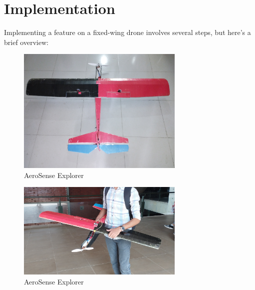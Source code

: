\documentclass[conference]{IEEEtran}
\begin{document}
\section{Implementation}

Implementing a feature on a fixed-wing drone involves several steps, but here's a brief overview\cite{ducard2009fault}\cite{mesquita2021steps}:
\begin{figure}[h]
    \begin{minipage}{0.47\textwidth}
        \flushright
        \includegraphics[width=8cm]{images/IMG_20240507_134642.jpg}
        \caption{AeroSense Explorer}
        \label{fig:enter-label}
    \end{minipage}
\end{figure}   

\begin{figure}[h]
    \begin{minipage}{0.47\textwidth}
        \flushright
        \includegraphics[width=8cm]{images/IMG_20240507_140708.jpg}
        \caption{AeroSense Explorer}
        \label{fig:enter-label}
    \end{minipage}
\end{figure}   
\end{document}

